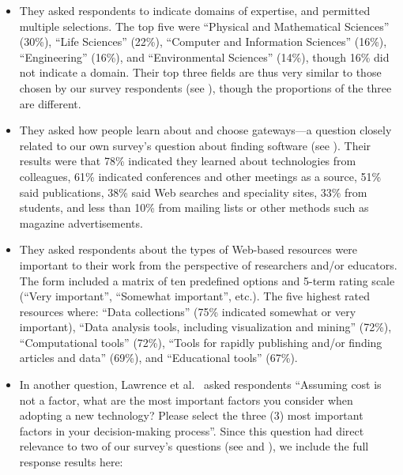\documentclass{casicswhitepaper}
\begin{document}
\begin{itemize}

\item They asked respondents to indicate domains of expertise, and permitted multiple selections.  The top five were ``Physical and Mathematical Sciences'' (30\%), ``Life Sciences'' (22\%), ``Computer and Information Sciences'' (16\%), ``Engineering'' (16\%), and ``Environmental Sciences'' (14\%), though 16\% did not indicate a domain.  Their top three fields are thus very similar to those chosen by our survey respondents (see ), though the proportions of the three are different.

\item They asked how people learn about and choose gateways---a question closely related to our own survey's question about finding software (see ).  Their results were that 78\% indicated they learned about technologies from colleagues, 61\% indicated conferences and other meetings as a source, 51\% said publications, 38\% said Web searches and speciality sites, 33\% from students, and less than 10\% from mailing lists or other methods such as magazine advertisements.

\item They asked respondents about the types of Web-based resources were important to their work from the perspective of researchers and/or educators.  The form included a matrix of ten predefined options and 5-term rating scale (``Very important'', ``Somewhat important'', etc.).  The five highest rated resources where: ``Data collections'' (75\% indicated somewhat or very important), ``Data analysis tools, including visualization and mining'' (72\%), ``Computational tools'' (72\%), ``Tools for rapidly publishing and/or finding articles and data'' (69\%), and ``Educational tools'' (67\%).

\item In another question, Lawrence et al.~\cite{lawrence2015science} asked respondents ``Assuming cost is not a factor, what are the most important factors you consider when adopting a new technology? Please select the three (3) most important factors in your decision-making process''.  Since this question had direct relevance to two of our survey's questions (see  and ), we include the full response results here:


\end{itemize}
\end{document}
